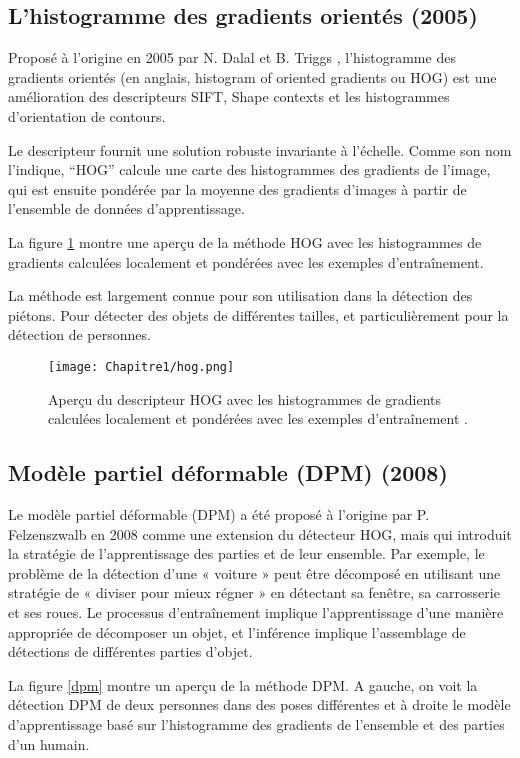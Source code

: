 \subsection{L'histogramme des gradients orientés  (2005)}

Proposé à l'origine en 2005 par N. Dalal et B. Triggs \cite{hog}, l'histogramme des gradients orientés (en anglais, histogram of oriented gradients ou HOG) est une amélioration des descripteurs SIFT, Shape contexts et les histogrammes d'orientation de contours. 

Le descripteur fournit une solution robuste invariante à l'échelle. 
Comme son nom l'indique, “HOG” calcule une carte des histogrammes des gradients de l'image, qui est ensuite pondérée par la moyenne des gradients d'images à partir de l'ensemble de données d'apprentissage.

La figure \ref{hog} montre une aperçu de la méthode HOG avec les histogrammes de gradients calculées localement et pondérées avec les exemples d'entraînement.

La méthode est largement connue pour son utilisation dans la détection des piétons. Pour détecter des objets de différentes tailles, et particulièrement pour la détection de personnes.

\begin{figure}[H]
\centering
\texttt{[image: Chapitre1/hog.png]}
\caption{Aperçu du descripteur HOG avec les histogrammes de gradients calculées localement et pondérées avec les exemples d'entraînement \cite{w1}.}
\label{hog}
\end{figure}


\subsection{Modèle partiel déformable (DPM) (2008)} 

Le modèle partiel déformable (DPM) \cite{dpm } a été proposé à l'origine par P. Felzenszwalb en 2008 comme une extension du détecteur HOG, mais qui introduit la stratégie de l'apprentissage des parties et de leur ensemble. 
Par exemple, le problème de la détection d'une « voiture » peut être décomposé en utilisant une stratégie de « diviser pour mieux régner » en détectant sa fenêtre, sa carrosserie et ses roues. Le processus d'entraînement implique l'apprentissage d'une manière appropriée de décomposer un objet, et l'inférence implique l'assemblage de détections de différentes parties d'objet.

La figure \ref{dpm}  montre un aperçu de la méthode DPM. A gauche, on voit la détection  DPM de deux personnes dans des poses différentes et à droite le modèle d'apprentissage basé sur l’histogramme des gradients de l'ensemble et des parties d'un humain.

